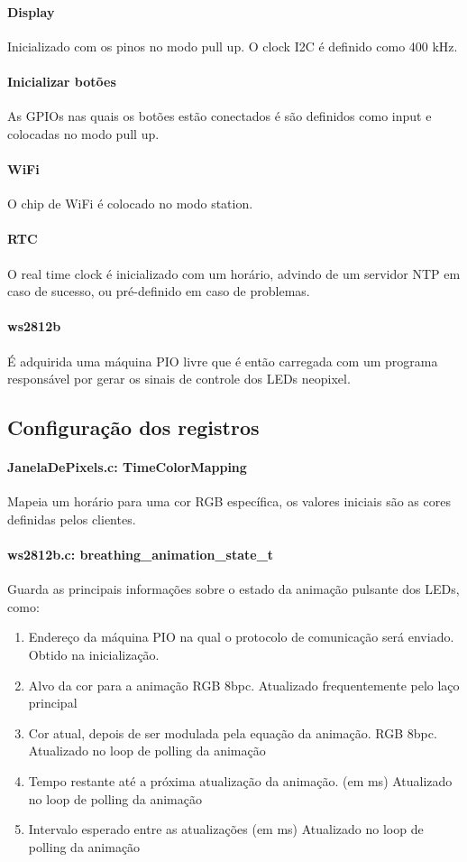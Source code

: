 \documentclass[12pt]{article}
\begin{document}
\paragraph{Display} Inicializado com os pinos no modo pull up. O clock I2C é definido como 400 kHz.
\paragraph{Inicializar botões} As GPIOs nas quais os botões estão conectados é são definidos como input e colocadas no modo pull up.
\paragraph{WiFi} O chip de WiFi é colocado no modo station.
\paragraph{RTC} O real time clock é inicializado com um horário, advindo de um servidor NTP em caso de sucesso, ou pré-definido em caso de problemas.
\paragraph{ws2812b} É adquirida uma máquina PIO livre que é então carregada com um programa responsável por gerar os sinais de controle dos LEDs neopixel.

\subsection{Configuração dos registros}
\paragraph{JanelaDePixels.c: TimeColorMapping} Mapeia um horário para uma cor RGB específica, os valores iniciais são as cores definidas pelos clientes.
\paragraph{ws2812b.c: breathing\_animation\_state\_t} Guarda as principais informações sobre o estado da animação pulsante dos LEDs, como:
\begin{enumerate}
    \item Endereço da máquina PIO na qual o protocolo de comunicação será enviado. Obtido na inicialização.
    \item Alvo da cor para a animação {RGB 8bpc}. Atualizado frequentemente pelo laço principal
    \item Cor atual, depois de ser modulada pela equação da animação. {RGB 8bpc}. Atualizado no loop de polling da animação
    \item Tempo restante até a próxima atualização da animação. (em ms) Atualizado no loop de polling da animação
    \item Intervalo esperado entre as atualizações (em ms) Atualizado no loop de polling da animação
\end{enumerate}
\end{document}
